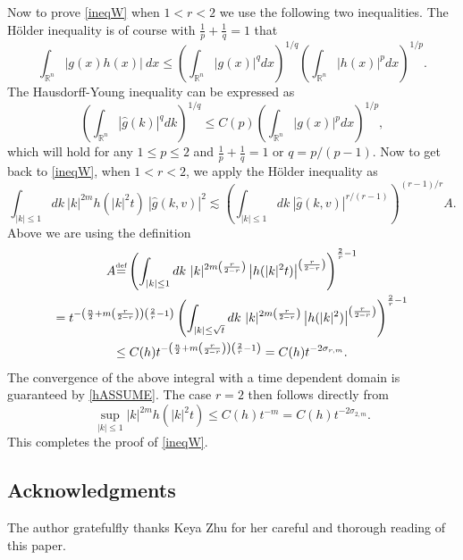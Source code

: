 \documentclass{amsart}
\numberwithin{equation}{section}
\begin{document}
Now to prove \eqref{ineqW} when $1<r< 2$ we use the following two inequalities.  The H\"{o}lder inequality is of course with $\frac{1}{p}+\frac{1}{q} = 1$ that
$$
\int_{{\mathbb R}^{n}} |g(x) h(x)| ~ dx
\le 
\left(\int_{{\mathbb R}^{n}} |g(x)|^q dx \right)^{1/q}
\left(\int_{{\mathbb R}^{n}} |h(x)|^p dx \right)^{1/p}.
$$
The Hausdorff-Young inequality can be expressed as
$$
\left(\int_{{\mathbb R}^{n}} |\hat{g}(k)|^q dk \right)^{1/q}
\le
C(p)
\left(\int_{{\mathbb R}^{n}} |g(x)|^p dx \right)^{1/p},
$$
which will hold for any 
$1\le p \le 2$
and
 $\frac{1}{p}+\frac{1}{q} = 1$
 or $q=p/(p-1)$.  Now to get back to \eqref{ineqW}, when $1<r< 2$,  we apply the H\"{o}lder inequality as
$$
 \int_{|k|\leq 1} dk ~ 
 |k|^{2m}
 h(|k|^2t) ~ |\hat{g}(k,{v})|^2
\lesssim
\left( \int_{|k|\leq 1} dk ~ |\hat{g}(k,{v})|^{r/(r-1)} \right)^{(r-1)/r}
A.
$$
Above we are using the definition
\begin{multline*}
A {\overset{\mbox{\tiny{def}}}{=}}  
\left( 
\int_{|k|\leq 1} dk ~ 
 |k|^{2m\left( \frac{r}{2-r}\right) } \left|  h(|k|^2 t) \right|^{\left( \frac{r}{2-r}\right) }
 \right)^{\frac{2}{r}-1}
 \\
=
 t^{-\left(\frac{n}{2}+ m\left( \frac{r}{2-r}\right) \right)\left( \frac{2}{r}-1 \right)}
 \left( 
\int_{|k|\leq \sqrt{t}} dk ~ 
 |k|^{2m\left( \frac{r}{2-r}\right) } \left|  h(|k|^2) \right|^{\left( \frac{r}{2-r}\right) }
 \right)^{\frac{2}{r}-1}
 \\
 \le
 C(h) t^{-\left(\frac{n}{2}+ m\left( \frac{r}{2-r}\right) \right)\left( \frac{2}{r}-1 \right)}
 =
 C(h) t^{-2\sigma_{r,m}}.
\end{multline*}
The convergence of the above integral with a time dependent domain is guaranteed by \eqref{hASSUME}.  The case $r=2$ then follows directly from 
$$
\sup_{|k|\leq 1} 
 |k|^{2m}
 h(|k|^2t)
 \le 
 C(h) t^{-m}
=
 C(h) t^{-2\sigma_{2,m}}.
$$
This completes the proof of \eqref{ineqW}.

\subsection*{Acknowledgments}  
 The author gratefulfly thanks Keya Zhu for her careful and thorough reading of this paper.
\end{document}
